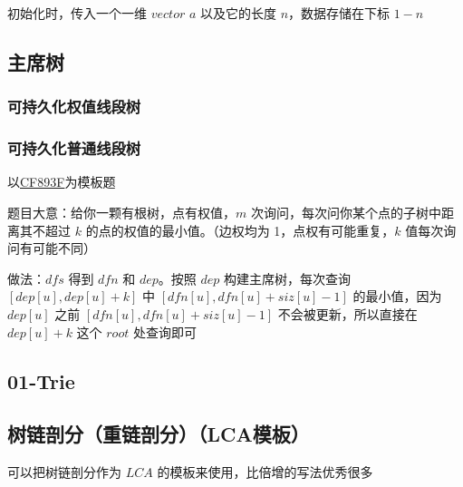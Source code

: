 \documentclass[12pt]{article}
\begin{document}
初始化时，传入一个一维 $vector$ $a$ 以及它的长度 $n$，数据存储在下标 $1-n$



\newpage

\subsection{主席树}

\subsubsection{可持久化权值线段树}



\newpage

\subsubsection{可持久化普通线段树}

以\href{http://codeforces.com/problemset/problem/893/F}{CF893F}为模板题

题目大意：给你一颗有根树，点有权值，$m$ 次询问，每次问你某个点的子树中距离其不超过 $k$ 的点的权值的最小值。（边权均为 1，点权有可能重复，$k$ 值每次询问有可能不同）

做法：$dfs$ 得到 $dfn$ 和 $dep$。按照 $dep$ 构建主席树，每次查询 $[dep[u],dep[u]+k]$ 中 $[dfn[u],dfn[u]+siz[u]-1]$ 的最小值，因为 $dep[u]$ 之前 $[dfn[u],dfn[u]+siz[u]-1]$ 不会被更新，所以直接在 $dep[u]+k$ 这个 $root$ 处查询即可



\newpage

\subsection{01-Trie}



\newpage

\subsection{树链剖分（重链剖分）（LCA模板）}

可以把树链剖分作为 $LCA$ 的模板来使用，比倍增的写法优秀很多
\end{document}
